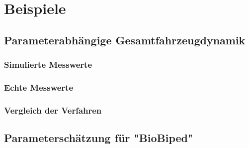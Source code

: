 	\section{Beispiele} %

		\subsection{Parameterabhängige Gesamtfahrzeugdynamik} %

			\subsubsection{Simulierte Messwerte} %

			\subsubsection{Echte Messwerte} %

			\subsubsection{Vergleich der Verfahren} %

		\subsection{Parameterschätzung für "BioBiped"} %
